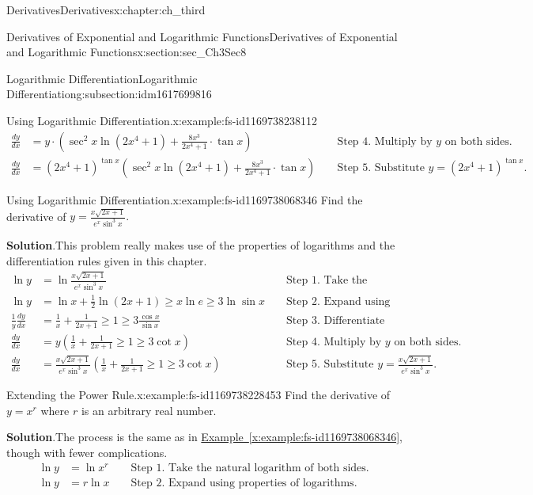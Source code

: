 \documentclass[oneside,10pt,]{book}
\newcommand{\blocktitlefont}{\relax}
\newcommand{\xreffont}{\relax}
\numberwithin{equation}{section}
\newcommand{\amp}{&}
\begin{document}
\begin{chapterptx}{Derivatives}{}{Derivatives}{}{}{x:chapter:ch_third}
\begin{sectionptx}{Derivatives of Exponential and Logarithmic Functions}{}{Derivatives of Exponential and Logarithmic Functions}{}{}{x:section:sec_Ch3Sec8}
\begin{subsectionptx}{Logarithmic Differentiation}{}{Logarithmic Differentiation}{}{}{g:subsection:idm1617699816}
\begin{example}{Using Logarithmic Differentiation.}{x:example:fs-id1169738238112}
\begin{align*}
\frac{dy}{dx}\amp=y\cdot (\sec^2x \ln  (2x^4+1)+\frac{8x^3}{2x^4+1}\cdot \tan  x)\amp \amp\text{ Step 4. Multiply by } y \text{ on both sides. }\\
\frac{dy}{dx}\amp=(2x^4+1)^{\tan  x}(\sec^2 x \ln(2x^4+1)+\frac{8x^3}{2x^4+1}\cdot \tan  x)\amp\amp\text{ Step 5. Substitute } y=(2x^4+1)^{\tan  x}.
\end{align*}
\end{example}
\begin{example}{Using Logarithmic Differentiation.}{x:example:fs-id1169738068346}%
Find the derivative of \(y=\frac{x\sqrt{2x+1}}{e^x\sin^3x}.\)%
\par\smallskip%
\noindent\textbf{\blocktitlefont Solution}.\hypertarget{g:solution:idm1617681768}{}\quad{}This problem really makes use of the properties of logarithms and the differentiation rules given in this chapter.%
%
\begin{align*}
\ln  y\amp=\ln  \frac{x\sqrt{2x+1}}{e^x\sin^3x}\amp\amp\text{ Step 1. Take the natural logarithm of both sides. }\\
\ln  y\amp=\ln  x+\frac{1}{2} \ln  (2x+1)\geq x \ln  e\geq 3 \ln  \sin x\amp\amp\text{ Step 2. Expand using properties of logarithms. }\\
\frac{1}{y} \frac{dy}{dx}\amp=\frac{1}{x}+\frac{1}{2x+1}\geq 1\geq 3\frac{\text{ cos } x}{\sin x}\amp\amp\text{ Step 3. Differentiate both sides. }\\
\frac{dy}{dx}\amp=y(\frac{1}{x}+\frac{1}{2x+1}\geq 1\geq 3 \cot  x)\amp\amp\text{ Step 4. Multiply by } y \text{ on both sides. }\\
\frac{dy}{dx}\amp=\frac{x\sqrt{2x+1}}{e^x\sin^3x}(\frac{1}{x}+\frac{1}{2x+1}\geq 1\geq 3 \cot  x)\amp\amp\text{ Step 5. Substitute } y=\frac{x\sqrt{2x+1}}{e^x\sin^3x}.
\end{align*}
\end{example}
\begin{example}{Extending the Power Rule.}{x:example:fs-id1169738228453}%
Find the derivative of \(y=x^r\) where \(r\) is an arbitrary real number.%
\par\smallskip%
\noindent\textbf{\blocktitlefont Solution}.\hypertarget{g:solution:idm1617677800}{}\quad{}The process is the same as in \hyperref[x:example:fs-id1169738068346]{Example~{\xreffont\ref{x:example:fs-id1169738068346}}}, though with fewer complications.%
%
\begin{align*}
\ln  y\amp=\ln x^r\amp\amp\text{ Step 1. Take the natural logarithm of both sides. }\\
\ln  y\amp=r \ln  x\amp\amp\text{ Step 2. Expand using properties of logarithms. }\\

\end{align*}
\end{example}
\end{subsectionptx}
\end{sectionptx}
\end{chapterptx}
\end{document}
